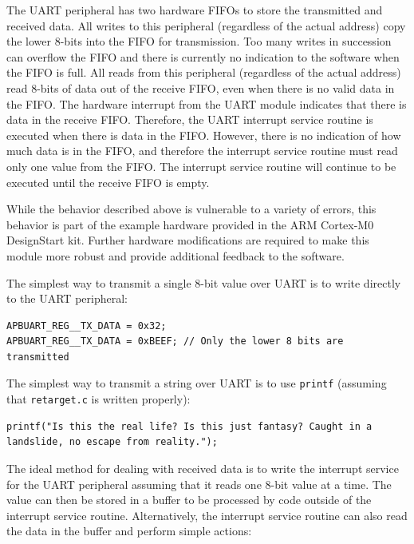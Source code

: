 The UART peripheral has two hardware FIFOs to store the transmitted and received data. All writes to this peripheral (regardless of the actual address) copy the lower 8-bits into the FIFO for transmission. Too many writes in succession can overflow the FIFO and there is currently no indication to the software when the FIFO is full. All reads from this peripheral (regardless of the actual address) read 8-bits of data out of the receive FIFO, even when there is no valid data in the FIFO. The hardware interrupt from the UART module indicates that there is data in the receive FIFO. Therefore, the UART interrupt service routine is executed when there is data in the FIFO. However, there is no indication of how much data is in the FIFO, and therefore the interrupt service routine must read only one value from the FIFO. The interrupt service routine will continue to be executed until the receive FIFO is empty.

While the behavior described above is vulnerable to a variety of errors, this behavior is part of the example hardware provided in the ARM Cortex-M0 DesignStart kit. Further hardware modifications are required to make this module more robust and provide additional feedback to the software.

The simplest way to transmit a single 8-bit value over UART is to write directly to the UART peripheral:
\begin{lstlisting}
APBUART_REG__TX_DATA = 0x32;
APBUART_REG__TX_DATA = 0xBEEF; // Only the lower 8 bits are transmitted
\end{lstlisting}

The simplest way to transmit a string over UART is to use \texttt{printf} (assuming that \texttt{retarget.c} is written properly):
\begin{lstlisting}
printf("Is this the real life? Is this just fantasy? Caught in a landslide, no escape from reality.");
\end{lstlisting}

The ideal method for dealing with received data is to write the interrupt service for the UART peripheral assuming that it reads one 8-bit value at a time. The value can then be stored in a buffer to be processed by code outside of the interrupt service routine. Alternatively, the interrupt service routine can also read the data in the buffer and perform simple actions:

